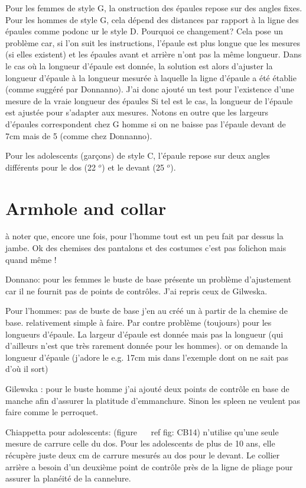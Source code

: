 \documentclass[11pt,a4paper]{report}
\begin{document}
Pour les femmes de style G, la  onstruction des épaules repose sur des angles fixes. Pour les hommes de style G, cela dépend des distances par rapport à la ligne des épaules comme podonc ur le style D. Pourquoi ce changement? Cela pose un problème car, si l'on suit les instructions, l'épaule est plus longue que les mesures (si elles existent) et les épaules avant et arrière n'ont pas la même longueur. Dans le cas où la longueur d'épaule est donnée, la solution est alors d'ajuster la longueur d'épaule à la longueur mesurée à laquelle la ligne d'épaule a été établie (comme suggéré par Donnanno). J'ai donc ajouté un test pour l'existence d'une mesure de la vraie longueur des épaules Si tel est le cas, la longueur de l'épaule est ajustée pour s'adapter aux mesures. Notons en outre que les largeurs d'épaules correspondent chez G homme si on ne baisse pas l'épaule devant de 7cm mais de 5 (comme chez Donnanno).


Pour les adolescents (garçons) de style C, l'épaule repose sur deux angles différents pour le dos (22 $ ^ o $) et le devant (25 $ ^ o $).



\section{Armhole and collar}

à noter que, encore une fois, pour l'homme tout est un peu fait par dessus
la jambe. Ok des chemises des pantalons et des costumes c'est pas
folichon mais quand même !

Donnano:  pour les femmes le buste de base présente un problème d'ajustement car il ne
fournit pas de points de contrôles. J'ai repris ceux de Gilweska.

Pour l'hommes: pas de buste de base j'en au  créé un à partir de la chemise de base.
relativement simple à faire. Par contre problème (toujours) pour les
longueurs d'épaule. La largeur d'épaule est donnée mais pas la
longueur (qui d'ailleurs n'est que très rarement donnée pour les
hommes). or on demande la longueur d'épaule (j'adore le e.g. 17cm mis
dans l'exemple dont on ne sait pas d'où il sort)

Gilewska : pour le buste homme j'ai ajouté  deux points de contrôle
en base de manche  afin d'assurer la platitude d'emmanchure. Sinon les
spleen ne veulent pas faire comme le perroquet.


Chiappetta pour adolescents: (figure ~ \ ref {fig: CB14}) n'utilise qu'une seule mesure de carrure celle du dos. Pour les adolescents de plus de 10 ans, elle récupère juste deux cm de carrure mesurés au dos pour le devant. Le collier arrière a besoin d'un deuxième point de contrôle près de la ligne de pliage pour assurer la planéité de la cannelure.
\end{document}
